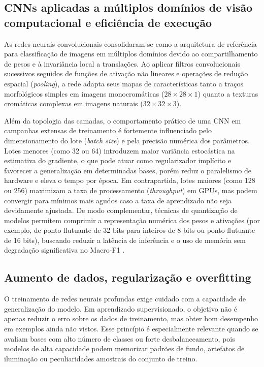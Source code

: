\documentclass[
    12pt,
    openright,
    oneside,
    a4paper,
    english,
    brazil
]{abntex2}
\begin{document}
\subsection{CNNs aplicadas a múltiplos domínios de visão computacional e eficiência de execução}

As redes neurais convolucionais consolidaram-se como a arquitetura de referência para classificação de imagens em múltiplos domínios devido ao compartilhamento de pesos e à invariância local a translações. Ao aplicar filtros convolucionais sucessivos seguidos de funções de ativação não lineares e operações de redução espacial (\textit{pooling}), a rede adapta seus mapas de características tanto a traços morfológicos simples em imagens monocromáticas (\(28 \times 28 \times 1\)) quanto a texturas cromáticas complexas em imagens naturais (\(32 \times 32 \times 3\)).

Além da topologia das camadas, o comportamento prático de uma CNN em campanhas extensas de treinamento é fortemente influenciado pelo dimensionamento do lote (\textit{batch size}) e pela precisão numérica dos parâmetros. Lotes menores (como 32 ou 64) introduzem maior variância estocástica na estimativa do gradiente, o que pode atuar como regularizador implícito e favorecer a generalização em determinadas bases, porém reduz o paralelismo de hardware e eleva o tempo por época. Em contrapartida, lotes maiores (como 128 ou 256) maximizam a taxa de processamento (\textit{throughput}) em GPUs, mas podem convergir para mínimos mais agudos caso a taxa de aprendizado não seja devidamente ajustada. De modo complementar, técnicas de quantização de modelos permitem comprimir a representação numérica dos pesos e ativações (por exemplo, de ponto flutuante de 32 bits para inteiros de 8 bits ou ponto flutuante de 16 bits), buscando reduzir a latência de inferência e o uso de memória sem degradação significativa no Macro-F1 \cite{goodfellow2016deep,zandieh2025turboquant}.

\subsection{Aumento de dados, regularização e overfitting}
\label{subsec:aumento_regularizacao_overfitting}

O treinamento de redes neurais profundas exige cuidado com a capacidade de generalização do modelo. Em aprendizado supervisionado, o objetivo não é apenas reduzir o erro sobre os dados de treinamento, mas obter bom desempenho em exemplos ainda não vistos. Esse princípio é especialmente relevante quando se avaliam bases com alto número de classes ou forte desbalanceamento, pois modelos de alta capacidade podem memorizar padrões de fundo, artefatos de iluminação ou peculiaridades amostrais do conjunto de treino.
\end{document}
